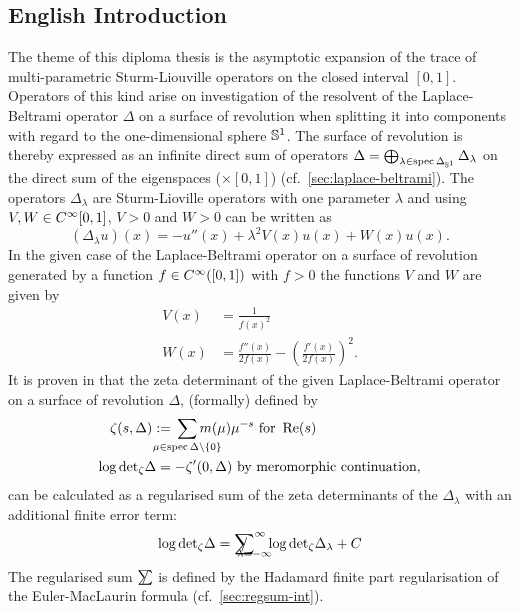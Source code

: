 \subsection{English Introduction}
The theme of this diploma thesis is the asymptotic expansion of the trace of
multi-parametric Sturm-Liouville operators on the closed interval $[0,1]$.
%
Operators of this kind arise on investigation of the resolvent of the
Laplace-Beltrami operator $\Delta$ on a surface of revolution when splitting it
into components with regard to the one-dimensional sphere ${\mathbb{S}^{1}}$. The
surface of revolution is thereby expressed as an infinite direct sum of
operators $\Delta =
\bigoplus_{\lambda\in\operatorname{spec}\Delta_{{\mathbb{S}^{1}}}}\Delta_\lambda$ on the
direct sum of the eigenspaces ($\times[0,1]$) (cf.\
\cref{sec:laplace-beltrami}).
%
The operators $\Delta_\lambda$ are Sturm-Lioville operators with one parameter
$\lambda$ and using $V,W\in C^\infty_{}{[0,1]}$, $V>0$ and $W>0$ can be written as
\begin{equation*}
  (\Delta_\lambda u)(x) = -u''(x) + \lambda^2 V(x) u(x) + W(x) u(x).
\end{equation*}
In the given case of the Laplace-Beltrami operator on a surface of revolution
generated by a function $f\in C^\infty_{}([0,1])$ with $f>0$ the functions $V$ and $W$
are given by
\begin{align*}
  V(x) &= \frac1{f(x)^2} \\
  W(x) &= \frac{f''(x)}{2f(x)} - \left(\frac{f'(x)}{2f(x)}\right)^2.
\end{align*}
It is proven in \cite{LV13} that the zeta determinant of the given
Laplace-Beltrami operator on a surface of revolution $\Delta$, (formally)
defined by
\begin{align*}
  \zeta(s,\Delta) := {} &
  \sum_{\mathclap{\mu\in\operatorname{spec}\Delta\setminus\{0\}}}
  m(\mu)\mu^{-s} \text{ for } \Re(s) \\
  \log\zdet \Delta = {} & {-\zeta'}(0,\Delta) \text{ by meromorphic
continuation},
\end{align*}
can be calculated as a regularised sum of the zeta determinants of the
$\Delta_\lambda$ with an additional finite error term:
\begin{equation*}
  \log\zdet\Delta = \Regsum_{\mathclap{\lambda =
  -\infty}}^\infty\log\zdet\Delta_\lambda + C
\end{equation*}
The regularised sum $\slashed{\sum}$ is defined by the Hadamard finite part
regularisation of the Euler-MacLaurin formula (cf.\ \cref{sec:regsum-int}).

